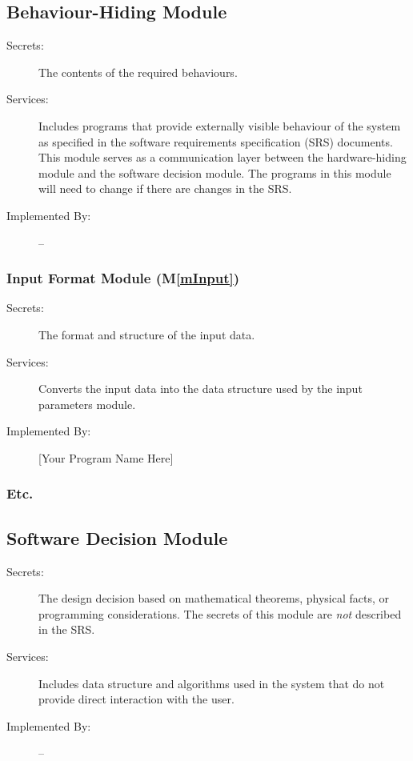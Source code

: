 \documentclass[12pt, titlepage]{article}
\newcommand{\mref}[1]{M\ref{#1}}
\begin{document}
\subsection{Behaviour-Hiding Module}

\begin{description}
\item[Secrets:]The contents of the required behaviours.
\item[Services:]Includes programs that provide externally visible behaviour of
  the system as specified in the software requirements specification (SRS)
  documents. This module serves as a communication layer between the
  hardware-hiding module and the software decision module. The programs in this
  module will need to change if there are changes in the SRS.
\item[Implemented By:] --
\end{description}

\subsubsection{Input Format Module (\mref{mInput})}

\begin{description}
\item[Secrets:]The format and structure of the input data.
\item[Services:]Converts the input data into the data structure used by the
  input parameters module.
\item[Implemented By:] [Your Program Name Here]
\end{description}

\subsubsection{Etc.}


\subsection{Software Decision Module}

\begin{description}
\item[Secrets:] The design decision based on mathematical theorems, physical
  facts, or programming considerations. The secrets of this module are
  \emph{not} described in the SRS.
\item[Services:] Includes data structure and algorithms used in the system that
  do not provide direct interaction with the user. 
\item[Implemented By:] --
\end{description}
\end{document}
